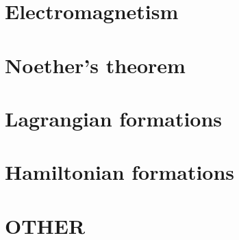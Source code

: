 \documentclass[oneside]{book}
\begin{document}




\part{Electromagnetism}


\part{Noether's theorem}


\part{Lagrangian formations}


\part{Hamiltonian formations}


\part{OTHER}

\end{document}
